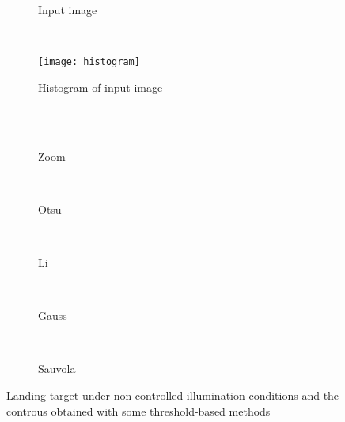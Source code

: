 \begin{figure}[!ht]
    \centering
    \begin{subfigure}[b]{0.3\textwidth}
        \caption{Input image}
        \label{fig:input_image}
    \end{subfigure}
    ~ %
    \begin{subfigure}[b]{0.3\textwidth}
        \texttt{[image: histogram]}
        \caption{Histogram of input image}
        \label{fig:histogram}
    \end{subfigure}\\
        ~ %
    \begin{subfigure}[b]{0.16\textwidth}
        \caption{Zoom}
        \label{fig:tar4_zoom}
    \end{subfigure}
        ~ %
    \begin{subfigure}[b]{0.16\textwidth}
        \caption{Otsu}
        \label{fig:otsu_th}
    \end{subfigure}
        ~ %
    \begin{subfigure}[b]{0.16\textwidth}
        \caption{Li}
        \label{fig:li_th}
    \end{subfigure}
        ~ %
    \begin{subfigure}[b]{0.16\textwidth}
        \caption{Gauss }
        \label{fig:gauss_th}
    \end{subfigure}
        ~ %
    \begin{subfigure}[b]{0.16\textwidth}
        \caption{Sauvola}
        \label{fig:sauvola_th}
    \end{subfigure}
    \caption{Landing target under non-controlled illumination conditions and the controus obtained with some threshold-based methods}\label{fig:thresholding_comp}
\end{figure}


